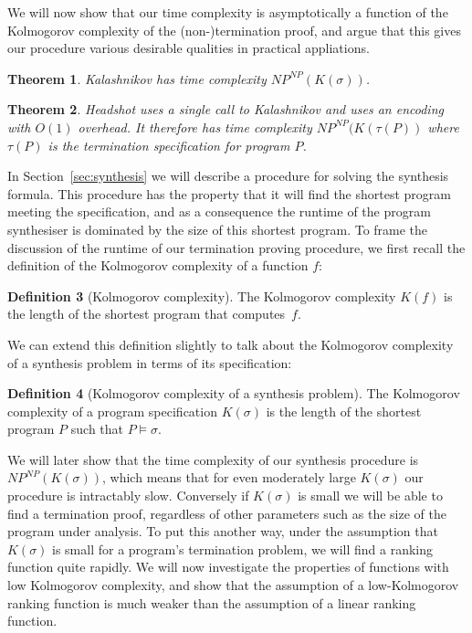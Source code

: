 \documentclass[preprint]{sigplanconf}
\newtheorem{theorem}{Theorem}
\theoremstyle{definition}
\newtheorem{definition}[theorem]{Definition}
\begin{document}
We will now show that our time complexity is asymptotically a function of
the Kolmogorov complexity of the (non-)termination proof, and argue
that this gives our procedure various desirable qualities in practical
appliations.
%
\begin{theorem}
 {\sc Kalashnikov} has time complexity $NP^{NP}(K(\sigma))$.
\end{theorem}

\begin{theorem}
 {\sc Headshot} uses a single call to {\sc Kalashnikov} and uses an encoding with $O(1)$
 overhead.  It therefore has time complexity $NP^{NP}(K(\tau(P))$ where $\tau(P)$ is the
 termination specification for program $P$.
\end{theorem}

In Section~\ref{sec:synthesis} we will describe a procedure for solving the synthesis formula.
This procedure has the property that it will find the shortest program meeting the
specification, and as a consequence the runtime of the program synthesiser is dominated
by the size of this shortest program.  To frame the discussion of the runtime of our
termination proving procedure, we first recall the definition of the Kolmogorov complexity
of a function $f$:

\begin{definition}[Kolmogorov complexity]
 The Kolmogorov complexity $K(f)$ is the length of the shortest program that
 computes~$f$.
\end{definition}

We can extend this definition slightly to talk about the Kolmogorov complexity of a
synthesis problem in terms of its specification:

\begin{definition}[Kolmogorov complexity of a synthesis problem]
 The Kolmogorov complexity of a program specification $K(\sigma)$ is the length of the shortest
 program $P$ such that $P \models \sigma$.
\end{definition}

We will later show that the time complexity of our synthesis procedure is $NP^{NP}(K(\sigma))$,
which means that for even moderately large $K(\sigma)$ our procedure is intractably slow.  Conversely
if $K(\sigma)$ is small we will be able to find a termination proof, regardless of other parameters
such as the size of the program under analysis.  To put this another way, under the assumption
that $K(\sigma)$ is small for a program's termination problem, we will find a ranking function
quite rapidly.  We will now investigate the properties of functions with low Kolmogorov complexity,
and show that the assumption of a low-Kolmogorov ranking function is much weaker than the assumption
of a linear ranking function.
\end{document}
